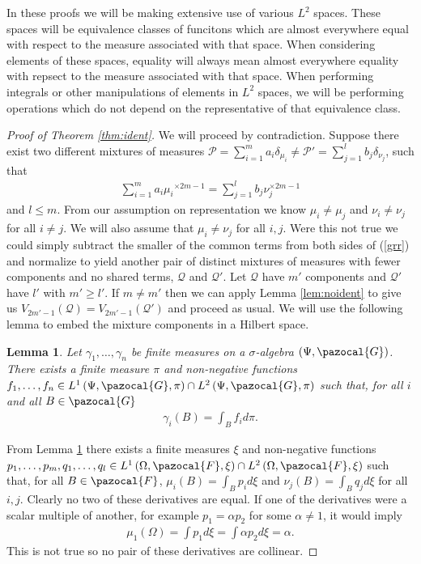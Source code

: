 \documentclass[aos]{imsart}
\def\sF{\pazocal{F}}
\def\sG{\pazocal{G}}
\def\sP{\mathscr{P}}
\def\sQ{\mathscr{Q}}
\theoremstyle{plain}
\newtheorem{lem}{Lemma}[section]
\theoremstyle{defintion}
\begin{document}
	In these proofs we will be making extensive use of various $L^2$ spaces. These spaces will be equivalence classes of funcitons which are almost everywhere equal with respect to the measure associated with that space. When considering elements of these spaces, equality will always mean almost everywhere equality with repsect to the measure associated with that space. When performing integrals or other manipulations of elements in $L^2$ spaces, we will be performing operations which do not depend on the representative of that equivalence class.
	\begin{proof}[Proof of Theorem \ref{thm:ident}]
		We will proceed by contradiction. Suppose there exist two different mixtures of measures $\sP = \sum_{i=1}^m a_i\delta_{\mu_i}  \neq \sP' = \sum_{j=1}^l b_j\delta_{\nu_j}$, such that
		\begin{eqnarray} 
			\sum_{i=1}^{m} a_i {\mu_i}^{\times 2m-1} = \sum_{j=1}^{l} b_j {\nu}_j^{\times 2m-1} \label{grr}
		\end{eqnarray}
		and $l\le m$. From our assumption on representation we know $\mu_i \neq \mu_j$ and $\nu_i \neq \nu_j$ for all $i\neq j$. We will also assume that $\mu_i \neq \nu_j$ for all $i,j$. Were this not true we could simply subtract the smaller of the common terms from both sides of (\ref{grr}) and normalize to yield another pair of distinct mixtures of measures with fewer components and no shared terms, $\sQ$ and $\sQ'$. Let $\sQ$ have $m'$ components and $\sQ'$ have $l'$ with $m'\ge l'$. If $m\neq m'$ then we can apply Lemma \ref{lem:noident} to give us $V_{2m'-1}\left( \sQ \right)= V_{2m'-1}\left( \sQ' \right)$ and proceed as usual. We will use the following lemma to embed the mixture components in a Hilbert space.
		\begin{lem} \label{lem:himbed}
			Let $\gamma_1,\ldots,\gamma_n$ be finite measures on a $\sigma$-algebra $\left( \Psi, \sG \right)$. There exists a finite measure $\pi$ and non-negative functions $f_1,\ldots,f_n \in  L^1\left( \Psi,\sG,\pi \right)\cap L^2\left( \Psi,\sG,\pi \right)$ such that, for all $i$ and all $B \in \sG$
			\begin{eqnarray*}
				\gamma_i(B)=\int_B f_i d\pi. 
			\end{eqnarray*}
		\end{lem}
		From Lemma \ref{lem:himbed} there exists a finite measures $\xi$ and non-negative functions $p_1,\ldots,p_m,q_1,\ldots,q_l \in L^1\left( \Omega, \sF, \xi \right)\cap L^2\left( \Omega, \sF, \xi \right)$ such that, for all $B\in \sF$, $\mu_i(B) = \int_B p_i d\xi$ and $\nu_j(B) = \int_B q_j d\xi$ for all $i,j$. Clearly no two of these derivatives are equal. If one of the derivatives were a scalar multiple of another, for example $p_1 = \alpha p_2$ for some $\alpha \neq 1$, it would imply
		\begin{eqnarray*}
			\mu_1\left( \Omega \right) = \int p_1 d\xi = \int \alpha p_2 d\xi=\alpha.
		\end{eqnarray*}
		This is not true so no pair of these derivatives are collinear.


\end{proof}
\end{document}
